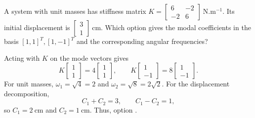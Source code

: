 \begin{quizquestion}[
  id=phy104-nm-050,
  topic=normal-modes,
  difficulty=challenge,
  marks=3,
  correct=E,
  tags={stiffness-matrix,eigenvectors,modal-decomposition},
  outcome={Determine modal coefficients and frequencies from a stiffness matrix}
]
  A system with unit masses has stiffness matrix \(K=\begin{bmatrix}6&-2\\-2&6\end{bmatrix}\ \mathrm{N.m^{-1}}\). Its initial displacement is \(\begin{bmatrix}3\\1\end{bmatrix}\ \mathrm{cm}\). Which option gives the modal coefficients in the basis \({[1,1]}^T,{[1,-1]}^T\) and the corresponding angular frequencies?
\end{quizquestion}
\begin{quizsolution}
  Acting with \(K\) on the mode vectors gives
    \[
      K\begin{bmatrix}1\\1\end{bmatrix}=4\begin{bmatrix}1\\1\end{bmatrix},
      \qquad
      K\begin{bmatrix}1\\-1\end{bmatrix}=8\begin{bmatrix}1\\-1\end{bmatrix}.
    \]
    For unit masses, \(\omega_1=\sqrt4=2\) and \(\omega_2=\sqrt8=2\sqrt2\). For the displacement decomposition,
    \[
      C_1+C_2=3,\qquad C_1-C_2=1,
    \]
    so \(C_1=2\ \mathrm{cm}\) and \(C_2=1\ \mathrm{cm}\). Thus, option \textbf{\quizcorrectletter}.
\end{quizsolution}

